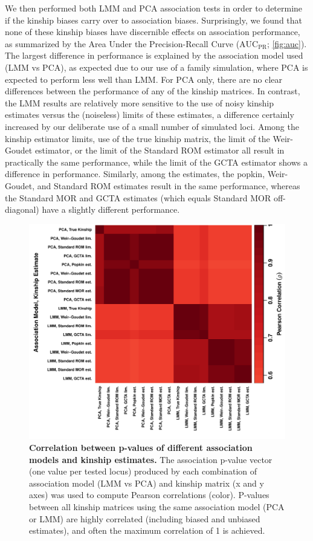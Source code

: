 \documentclass[11pt]{article}
\newcommand{\auc}{\text{AUC}_\text{PR}}
\begin{document}
We then performed both LMM and PCA association tests in order to determine if the kinship biases carry over to association biases.
Surprisingly, we found that none of these kinship biases have discernible effects on association performance, as summarized by the Area Under the Precision-Recall Curve ($\auc$; \cref{fig:auc}).
The largest difference in performance is explained by the association model used (LMM vs PCA), as expected due to our use of a family simulation, where PCA is expected to perform less well than LMM.
For PCA only, there are no clear differences between the performance of any of the kinship matrices.
In contrast, the LMM results are relatively more sensitive to the use of noisy kinship estimates versus the (noiseless) limits of these estimates, a difference certainly increased by our deliberate use of a small number of simulated loci.
Among the kinship estimator limits, use of the true kinship matrix, the limit of the Weir-Goudet estimator, or the limit of the Standard ROM estimator all result in practically the same performance, while the limit of the GCTA estimator shows a difference in performance.
Similarly, among the estimates, the popkin, Weir-Goudet, and Standard ROM estimates result in the same performance, whereas the Standard MOR and GCTA estimates (which equals Standard MOR off-diagonal) have a slightly different performance.

\begin{figure}[bp!]
  \centering
  \includegraphics[width=\textwidth]{pvals_cor.pdf}
  \caption{
    {\bf Correlation between p-values of different association models and kinship estimates.}
    The association p-value vector (one value per tested locus) produced by each combination of association model (LMM vs PCA) and kinship matrix (x and y axes) was used to compute Pearson correlations (color).
    P-values between all kinship matrices using the same association model (PCA or LMM) are highly correlated (including biased and unbiased estimates), and often the maximum correlation of 1 is achieved.
  }
  \label{fig:pvals_cor}
\end{figure}
\end{document}
